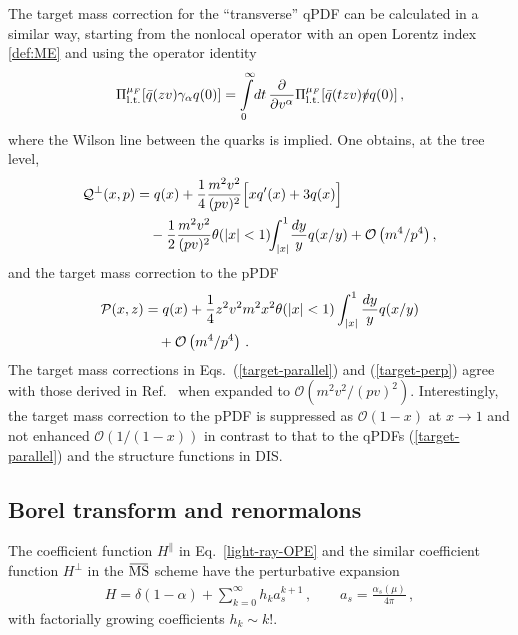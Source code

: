 \documentclass[aps,prd,twocolumn,a4paper,superscriptaddress,10pt,showpacs,notitlepage,floatfix]{revtex4-1}
\newcommand{\overbar}[1]{\mkern 1.5mu\overline{\mkern-1.5mu#1\mkern-1.5mu}\mkern 1.5mu}
\newcommand{\MSbar}{\overbar{\text{MS}}}
\begin{document}
The target mass correction for the ``transverse'' qPDF can be calculated in a similar way,
starting from the nonlocal operator with an open Lorentz index \eqref{def:ME} and 
using the operator identity~\cite{Balitsky:1987bk}
\begin{align}
\Pi_{\rm l.t.}^{\mu_F}[\bar q (z v) \gamma_\alpha q(0)]
=  \int\limits_0^\infty \!dt\,\frac{\partial}{\partial v^\alpha} 
\Pi_{\rm l.t.}^{\mu_F}[\bar q ( t z v) \slashed{v} q(0)]\,,
\end{align}   
where the Wilson line between the quarks is implied. One obtains, at the tree level,
\begin{align}
\label{target-perp}
 \mathcal{Q}^\perp(x,p)  &=  q(x) + \frac{1}{4} \frac{ m^2 v^2 }{(pv)^2} \Big[ x q'(x) + 3 q(x) \Big]
\notag\\&\quad
-  \frac{1}{2} \frac{m^2 v^2}{(pv)^2} \theta(|x|<1)\!\! \int_{|x|}^1\! \frac{dy}{y} q(x/y) 
+ \mathcal{O}\left({m^4}/{p^4}\right),
\end{align}
and the target mass correction to the pPDF
\begin{align}
\label{target-pPDF}
 \mathcal{P}(x,z) &=  q(x) +  \frac14 z^2 v^2 m^2 x^2 \theta(|x|<1) \int_{|x|}^1 \frac{dy}{y} q(x/y)
\notag\\&\quad
+ \mathcal{O}\left({m^4}/{p^4}\right)\,.
\end{align}
The target mass corrections in Eqs.~(\ref{target-parallel}) and (\ref{target-perp}) agree with those derived in Ref.~\cite{Chen:2016utp} when expanded to $\mathcal O(m^2v^2/(pv)^2)$. Interestingly, the target mass correction to the pPDF is suppressed as $\mathcal{O}(1-x)$ at $x\to 1$ and not enhanced $\mathcal{O}(1/(1-x))$ 
in contrast to that to the qPDFs (\ref{target-parallel}) and the structure functions in DIS.

\subsection{Borel transform and renormalons}

The coefficient function $H^\parallel$ in Eq.~\eqref{light-ray-OPE} and the similar coefficient function 
$H^\perp$ in the $\MSbar$ scheme have the perturbative expansion 
\begin{align}
 H = \delta(1-\alpha) + \sum_{k=0}^\infty h_k a_s^{k+1}\,,\qquad a_s = \frac{\alpha_s(\mu)}{4\pi}\,, 
\end{align}
with factorially growing coefficients $h_k\sim k!$.
\end{document}
